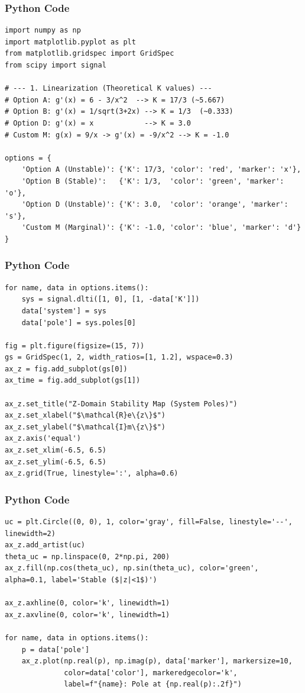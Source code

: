 \documentclass{beamer}
\begin{document}
\begin{frame}[fragile]
    \frametitle{Python Code }
    \begin{lstlisting}
import numpy as np
import matplotlib.pyplot as plt
from matplotlib.gridspec import GridSpec
from scipy import signal

# --- 1. Linearization (Theoretical K values) ---
# Option A: g'(x) = 6 - 3/x^2  --> K = 17/3 (~5.667)
# Option B: g'(x) = 1/sqrt(3+2x) --> K = 1/3  (~0.333)
# Option D: g'(x) = x            --> K = 3.0
# Custom M: g(x) = 9/x -> g'(x) = -9/x^2 --> K = -1.0

options = {
    'Option A (Unstable)': {'K': 17/3, 'color': 'red', 'marker': 'x'},
    'Option B (Stable)':   {'K': 1/3,  'color': 'green', 'marker': 'o'},
    'Option D (Unstable)': {'K': 3.0,  'color': 'orange', 'marker': 's'},
    'Custom M (Marginal)': {'K': -1.0, 'color': 'blue', 'marker': 'd'}
}
   \end{lstlisting}
\end{frame}
\begin{frame}[fragile]
\frametitle{Python Code }
\begin{lstlisting}
for name, data in options.items():
    sys = signal.dlti([1, 0], [1, -data['K']])
    data['system'] = sys
    data['pole'] = sys.poles[0]

fig = plt.figure(figsize=(15, 7))
gs = GridSpec(1, 2, width_ratios=[1, 1.2], wspace=0.3)
ax_z = fig.add_subplot(gs[0])
ax_time = fig.add_subplot(gs[1])

ax_z.set_title("Z-Domain Stability Map (System Poles)")
ax_z.set_xlabel("$\mathcal{R}e\{z\}$")
ax_z.set_ylabel("$\mathcal{I}m\{z\}$")
ax_z.axis('equal')
ax_z.set_xlim(-6.5, 6.5) 
ax_z.set_ylim(-6.5, 6.5)
ax_z.grid(True, linestyle=':', alpha=0.6)
\end{lstlisting}
\end{frame}

\begin{frame}[fragile]
\frametitle{Python Code }
\begin{lstlisting}
uc = plt.Circle((0, 0), 1, color='gray', fill=False, linestyle='--', linewidth=2)
ax_z.add_artist(uc)
theta_uc = np.linspace(0, 2*np.pi, 200)
ax_z.fill(np.cos(theta_uc), np.sin(theta_uc), color='green', alpha=0.1, label='Stable ($|z|<1$)')

ax_z.axhline(0, color='k', linewidth=1)
ax_z.axvline(0, color='k', linewidth=1)

for name, data in options.items():
    p = data['pole']
    ax_z.plot(np.real(p), np.imag(p), data['marker'], markersize=10, 
              color=data['color'], markeredgecolor='k', 
              label=f"{name}: Pole at {np.real(p):.2f}")
    \end{lstlisting}
\end{frame}
\end{document}
